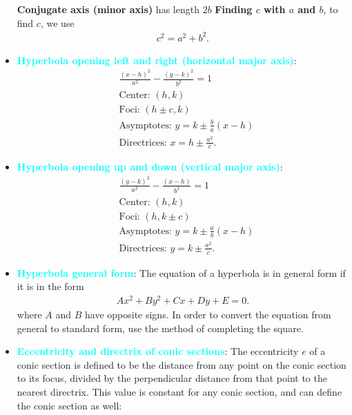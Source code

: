 \documentclass{report}
\begin{document}
\begin{itemize}
        \smallbreak \noindent
        \textbf{Conjugate axis (minor axis)} has length $2b$
        \smallbreak \noindent
        \textbf{Finding $c$ with $a$ and $b$}, to find $c$, we use
        \begin{align*}
            c^{2} = a^{2} + b^{2}
        .\end{align*}
    \item \textbf{\textcolor{cyan}{Hyperbola opening left and right (horizontal major axis)}}:
        \begin{align*}
            &\frac{(x-h)^{2}}{a^{2}} - \frac{(y-k)^{2}}{b^{2}} = 1 \\
            &\text{Center: } (h,k) \\
            &\text{Foci: } (h\pm c, k) \\
            &\text{Asymptotes: } y= k\pm \frac{b}{a}(x-h) \\
            &\text{Directrices: } x=h\pm \frac{a^{2}}{c}
        .\end{align*}
    \item \textbf{\textcolor{cyan}{Hyperbola opening up and down (vertical major axis)}}:
        \begin{align*}
            &\frac{(y-k)^{2}}{a^{2}} - \frac{(x-h)}{b^{2}} = 1 \\
            &\text{Center: } (h,k) \\
            &\text{Foci: } (h, k\pm c) \\
            &\text{Asymptotes: } y= k\pm \frac{a}{b}(x-h) \\
            &\text{Directrices: } y=k\pm \frac{a^{2}}{c}
        .\end{align*}
    \item \textbf{\textcolor{cyan}{Hyperbola general form}}: The equation of a hyperbola is in general form if it is in the form  
        \begin{align*}
            Ax^{2} + By^{2} + Cx + Dy + E = 0
        .\end{align*}
        \bigbreak \noindent 
      where $A$ and $B$ have opposite signs. In order to convert the equation from general to standard form, use the method of completing the square.
    \item \textbf{\textcolor{cyan}{Eccentricity and directrix of conic sections}}:
    The eccentricity $e$ of a conic section is defined to be the distance from any point on the conic section to its focus, divided by the perpendicular distance from that point to the nearest directrix. This value is constant for any conic section, and can define the conic section as well:

\end{itemize}
\end{document}
